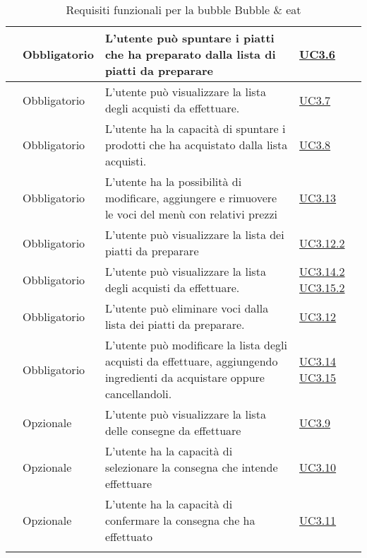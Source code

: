 \begin{longtable}{|P{1.5cm}|P{2.5cm}|P{6.5cm}|P{2.5cm}|}
	\hline \RequisitoObF\label{L26} & Obbligatorio & L'utente  può spuntare i piatti che ha preparato dalla lista di piatti da preparare  & \hyperref[UC3.6]{UC3.6} \\
	\hline \RequisitoObF\label{L27} & Obbligatorio & L'utente  può visualizzare la lista degli acquisti da effettuare. & \hyperref[UC3.7]{UC3.7} \\
	\hline \RequisitoObF\label{L28} & Obbligatorio & L'utente  ha la capacità di spuntare i prodotti che ha acquistato dalla lista acquisti.
	 & \hyperref[UC3.8]{UC3.8} \\
	\hline \RequisitoObF\label{L29} & Obbligatorio & L'utente  ha la possibilità di modificare, aggiungere e rimuovere le voci del menù con relativi prezzi & \hyperref[UC3.13]{UC3.13} \\
	\hline \RequisitoObF\label{L30} & Obbligatorio & L'utente  può visualizzare la lista dei piatti da preparare & \hyperref[UC3.12.2]{UC3.12.2} \\
	\hline \RequisitoObF\label{L31} & Obbligatorio & L'utente  può visualizzare la lista degli acquisti da effettuare. & \hyperref[UC3.14.2]{UC3.14.2} \hyperref[UC3.15.2]{UC3.15.2} \\
	\hline \RequisitoObF\label{L32} & Obbligatorio & L'utente  può eliminare voci dalla lista dei piatti da preparare. & \hyperref[UC3.12]{UC3.12} \\
	\hline \RequisitoObF\label{L53} & Obbligatorio & L'utente  può modificare la lista degli acquisti da effettuare, aggiungendo ingredienti da acquistare oppure cancellandoli.
	 & \hyperref[UC3.14]{UC3.14} \linebreak \hyperref[UC3.15]{UC3.15} \\	 
	\hline \RequisitoOpF\label{L50} & Opzionale & L'utente  può visualizzare la lista delle consegne da effettuare & \hyperref[UC3.9]{UC3.9} \\
	\hline \RequisitoOpF\label{L51} & Opzionale & L'utente  ha la capacità di selezionare la consegna che intende effettuare & \hyperref[UC3.10]{UC3.10} \\
	\hline \RequisitoOpF\label{L52} & Opzionale & L'utente  ha la capacità di confermare la consegna che ha effettuato & \hyperref[UC3.11]{UC3.11} \\
	\hline
	\caption{Requisiti funzionali per la bubble Bubble \& eat}
\end{longtable}

